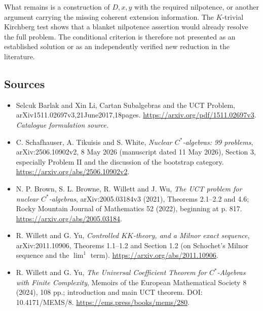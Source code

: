 \documentclass[11pt,a4paper]{article}
\begin{document}
What remains is a construction of $D,x,y$ with the required nilpotence,
or another argument carrying the missing coherent extension information.
The $K$-trivial Kirchberg test shows that a blanket nilpotence assertion
would already resolve the full problem. The conditional criterion is
therefore not presented as an established solution or as an independently
verified new reduction in the literature.

\subsection{Sources}
\begin{itemize}\raggedright
\item[\textnormal{[S1]}]\hypertarget{source:statement:1}{} Selcuk Barlak and Xin Li, Cartan Subalgebras and the UCT Problem, arXiv1511.02697v3,21June2017,18pages.
\url{https://arxiv.org/pdf/1511.02697v3}.
{\small\textit{Catalogue formulation source.}}
\item[\textnormal{[E1]}]\hypertarget{extra:statement:1}{}
C. Schafhauser, A. Tikuisis and S. White,
\emph{Nuclear $C^*$-algebras: 99 problems}, arXiv:2506.10902v2,
8 May 2026 (manuscript dated 11 May 2026), Section 3, especially Problem II
and the discussion of the bootstrap category.
\url{https://arxiv.org/abs/2506.10902v2}.
\item[\textnormal{[E2]}]\hypertarget{extra:statement:2}{}
N. P. Brown, S. L. Browne, R. Willett and J. Wu,
\emph{The UCT problem for nuclear $C^*$-algebras},
arXiv:2005.03184v3 (2021), Theorems 2.1--2.2 and 4.6;
Rocky Mountain Journal of Mathematics 52 (2022), beginning at p. 817.
\url{https://arxiv.org/abs/2005.03184}.
\item[\textnormal{[E3]}]\hypertarget{extra:statement:3}{}
R. Willett and G. Yu, \emph{Controlled $KK$-theory, and a Milnor exact
sequence}, arXiv:2011.10906, Theorems 1.1--1.2 and Section 1.2
(on Schochet's Milnor sequence and the $\lim^1$ term).
\url{https://arxiv.org/abs/2011.10906}.
\item[\textnormal{[E4]}]\hypertarget{extra:statement:4}{}
R. Willett and G. Yu, \emph{The Universal Coefficient Theorem for
$C^*$-Algebras with Finite Complexity}, Memoirs of the European
Mathematical Society 8 (2024), 108 pp.; introduction and main UCT theorem.
DOI: 10.4171/MEMS/8.
\url{https://ems.press/books/mems/280}.
\end{itemize}
\end{document}
